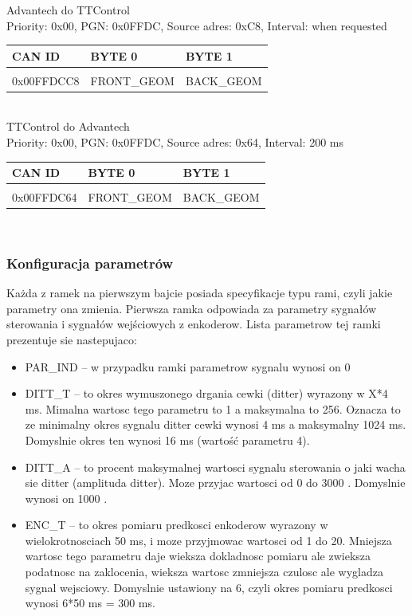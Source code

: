 \documentclass{article}
\begin{document}
Advantech do TTControl\\
Priority: 0x00, PGN: 0x0FFDC, Source adres: 0xC8, Interval: when requested \\
\begin{left}
\begin{tabular}{ |p{2cm}|p{2.5cm}|p{2.5cm}|} 
 \hline
 CAN ID & BYTE 0 & BYTE 1 \\ \hline
 & & \\
0x00FFDCC8 & FRONT\_GEOM & BACK\_GEOM \\ 
 \hline
\end{tabular}
\end{left}\\

TTControl do Advantech\\
Priority: 0x00, PGN: 0x0FFDC, Source adres: 0x64, Interval: 200 ms \\
\begin{left}
\begin{tabular}{ |p{2cm}|p{2.5cm}|p{2.5cm}|} 
 \hline
 CAN ID & BYTE 0 & BYTE 1 \\ \hline
 & & \\
0x00FFDC64 & FRONT\_GEOM & BACK\_GEOM \\ 
 \hline
\end{tabular}
\end{left}\\

\subsubsection{Konfiguracja parametrów}
Każda z ramek na pierwszym bajcie posiada specyfikacje typu rami, czyli jakie parametry ona zmienia.
Pierwsza ramka odpowiada za parametry sygnałów sterowania i sygnałów wejściowych z enkoderow. Lista parametrow tej ramki prezentuje sie nastepujaco:
\begin{itemize}
\item PAR\_IND -- w przypadku ramki parametrow sygnalu wynosi on 0
\item DITT\_T -- to okres wymuszonego drgania cewki (ditter) wyrazony w X*4 ms. Mimalna wartosc tego parametru to 1 a maksymalna to 256. Oznacza to ze minimalny okres sygnalu ditter cewki wynosi 4 ms a maksymalny 1024 ms. Domyslnie okres ten wynosi 16 ms (wartość parametru 4).
\item DITT\_A -- to procent maksymalnej wartosci sygnalu sterowania o jaki wacha sie ditter (amplituda ditter). Moze przyjac wartosci od 0 \permil do 3000 \permil. Domyslnie wynosi on 1000 \permil. 
\item ENC\_T -- to okres pomiaru predkosci enkoderow wyrazony w wielokrotnosciach 50 ms, i moze przyjmowac wartosci od 1 do 20. Mniejsza wartosc tego parametru daje wieksza dokladnosc pomiaru ale zwieksza podatnosc na zaklocenia, wieksza wartosc zmniejsza czulosc ale wygladza sygnal wejsciowy. Domyslnie ustawiony na 6, czyli okres pomiaru predkosci wynosi 6*50 ms  = 300 ms.  
\end{itemize}
\end{document}
